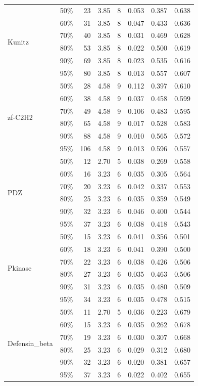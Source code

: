 \documentclass[10pt]{article}
\begin{document}
\begin{table}[p]
\begin{tabular}{@{}llrrrrcc@{}}
\midrule
\multirow{6}{*}{Kunitz}
 & 50\% &  23 & 3.85 &  8 & 0.053 & 0.387 & 0.638 \\
 & 60\% &  31 & 3.85 &  8 & 0.047 & 0.433 & 0.636 \\
 & 70\% &  40 & 3.85 &  8 & 0.031 & 0.469 & 0.628 \\
\cmidrule{2-8}
 & 80\% &  53 & 3.85 &  8 & 0.022 & 0.500 & 0.619 \\
 & 90\% &  69 & 3.85 &  8 & 0.023 & 0.535 & 0.616 \\
 & 95\% &  80 & 3.85 &  8 & 0.013 & 0.557 & 0.607 \\
\midrule
\multirow{6}{*}{zf-C2H2}
 & 50\% &  28 & 4.58 &  9 & 0.112 & 0.397 & 0.610 \\
 & 60\% &  38 & 4.58 &  9 & 0.037 & 0.458 & 0.599 \\
 & 70\% &  49 & 4.58 &  9 & 0.106 & 0.483 & 0.595 \\
\cmidrule{2-8}
 & 80\% &  65 & 4.58 &  9 & 0.017 & 0.528 & 0.583 \\
 & 90\% &  88 & 4.58 &  9 & 0.010 & 0.565 & 0.572 \\
 & 95\% & 106 & 4.58 &  9 & 0.013 & 0.596 & 0.557 \\
\midrule
\multirow{6}{*}{PDZ}
 & 50\% &  12 & 2.70 &  5 & 0.038 & 0.269 & 0.558 \\
 & 60\% &  16 & 3.23 &  6 & 0.035 & 0.305 & 0.564 \\
 & 70\% &  20 & 3.23 &  6 & 0.042 & 0.337 & 0.553 \\
\cmidrule{2-8}
 & 80\% &  25 & 3.23 &  6 & 0.035 & 0.359 & 0.549 \\
 & 90\% &  32 & 3.23 &  6 & 0.046 & 0.400 & 0.544 \\
 & 95\% &  37 & 3.23 &  6 & 0.038 & 0.418 & 0.543 \\
\midrule
\multirow{6}{*}{Pkinase}
 & 50\% &  15 & 3.23 &  6 & 0.041 & 0.356 & 0.501 \\
 & 60\% &  18 & 3.23 &  6 & 0.041 & 0.390 & 0.500 \\
 & 70\% &  22 & 3.23 &  6 & 0.038 & 0.426 & 0.506 \\
\cmidrule{2-8}
 & 80\% &  27 & 3.23 &  6 & 0.035 & 0.463 & 0.506 \\
 & 90\% &  31 & 3.23 &  6 & 0.035 & 0.480 & 0.509 \\
 & 95\% &  34 & 3.23 &  6 & 0.035 & 0.478 & 0.515 \\
\midrule
\multirow{6}{*}{Defensin\_beta}
 & 50\% &  11 & 2.70 &  5 & 0.036 & 0.223 & 0.679 \\
 & 60\% &  15 & 3.23 &  6 & 0.035 & 0.262 & 0.678 \\
 & 70\% &  19 & 3.23 &  6 & 0.030 & 0.307 & 0.668 \\
\cmidrule{2-8}
 & 80\% &  25 & 3.23 &  6 & 0.029 & 0.312 & 0.680 \\
 & 90\% &  32 & 3.23 &  6 & 0.020 & 0.381 & 0.657 \\
 & 95\% &  37 & 3.23 &  6 & 0.022 & 0.402 & 0.655 \\
\bottomrule
\end{tabular}
\end{table}
\end{document}
